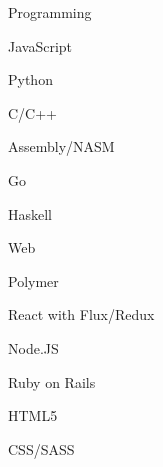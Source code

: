 


\begin{cvskills}


\cvskill
{Programming} %
{\begin{skillsitems}
\item JavaScript
\item Python
\item C/C++
\item Assembly/NASM
\item Go
\item Haskell
\end{skillsitems}
}


\cvskill
{Web} %
{
\begin{skillsitems}
\item Polymer
\item React with Flux/Redux
\item Node.JS
\item Ruby on Rails
\item HTML5
\item CSS/SASS
\end{skillsitems}
} %


\end{cvskills}
